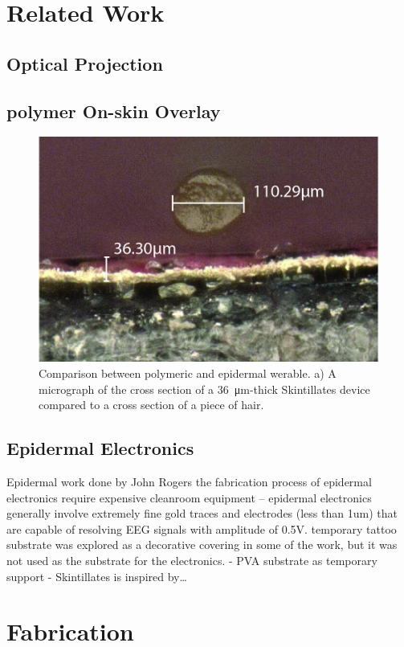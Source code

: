 \documentclass{sigchi}
\begin{document}
\section{Related Work}
\subsection{Optical Projection}
\subsection{polymer On-skin Overlay}
\begin{figure}[!h]
\centering
\includegraphics[width=1\columnwidth]{figures/Figure2_1}
\caption{Comparison between polymeric and epidermal werable. a) A micrograph of the cross section of a \SI{36}{\micro\metre}-thick Skintillates device compared to a cross section of a piece of hair.}
\label{fig:figure2}
\end{figure}

\subsection{Epidermal Electronics}
Epidermal work done by John Rogers 
the fabrication process of epidermal electronics require expensive cleanroom equipment – epidermal electronics generally involve extremely fine gold traces and electrodes (less than 1um) that are capable of resolving EEG signals with amplitude of 0.5V.
temporary tattoo substrate was explored as a decorative covering in some of the work, but it was not used as the substrate for the electronics. 
- PVA substrate as temporary support
- Skintillates is inspired by…


\section{Fabrication}
\end{document}
